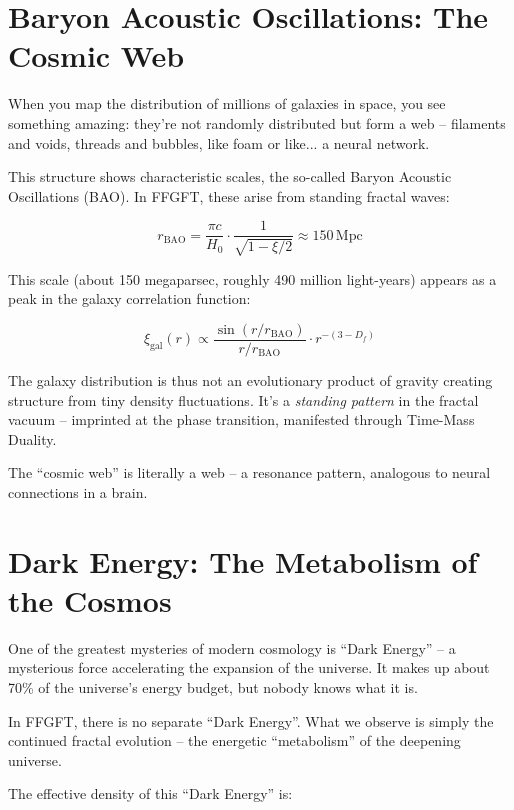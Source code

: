 \documentclass[12pt,a4paper]{article}
\begin{document}
\section{Baryon Acoustic Oscillations: The Cosmic Web}

When you map the distribution of millions of galaxies in space, you see something amazing: they're not randomly distributed but form a web -- filaments and voids, threads and bubbles, like foam or like... a neural network.

This structure shows characteristic scales, the so-called Baryon Acoustic Oscillations (BAO). In FFGFT, these arise from standing fractal waves:

\begin{equation}
r_{\text{BAO}} = \frac{\pi c}{H_0} \cdot \frac{1}{\sqrt{1 - \xi/2}} \approx 150 \, \text{Mpc}
\end{equation}

This scale (about 150 megaparsec, roughly 490 million light-years) appears as a peak in the galaxy correlation function:

\begin{equation}
\xi_{\text{gal}}(r) \propto \frac{\sin(r/r_{\text{BAO}})}{r/r_{\text{BAO}}} \cdot r^{-(3-D_f)}
\end{equation}

The galaxy distribution is thus not an evolutionary product of gravity creating structure from tiny density fluctuations. It's a \textit{standing pattern} in the fractal vacuum -- imprinted at the phase transition, manifested through Time-Mass Duality.

The ``cosmic web'' is literally a web -- a resonance pattern, analogous to neural connections in a brain.

\section{Dark Energy: The Metabolism of the Cosmos}

One of the greatest mysteries of modern cosmology is ``Dark Energy'' -- a mysterious force accelerating the expansion of the universe. It makes up about 70\% of the universe's energy budget, but nobody knows what it is.

In FFGFT, there is no separate ``Dark Energy''. What we observe is simply the continued fractal evolution -- the energetic ``metabolism'' of the deepening universe.

The effective density of this ``Dark Energy'' is:
\end{document}
